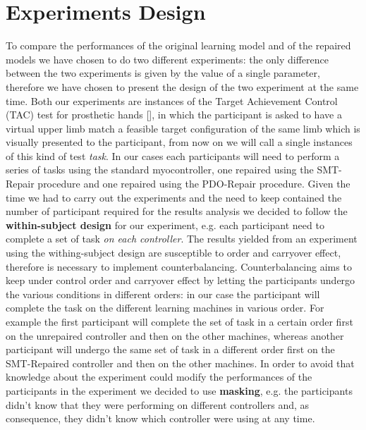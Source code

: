 \section{Experiments Design}\label{sec:exp-design}
To compare the performances of the original learning model and of the repaired models we have chosen to do two different experiments: the only difference between the two experiments is given by the value of a single parameter, therefore we have chosen to present the design of the two experiment at the same time.
Both our experiments are instances of the Target Achievement Control (TAC) test for prosthetic hands [\cite{simon2011target}], in which the participant is asked to have a virtual upper limb match a feasible target configuration of the same limb which is visually presented to the participant, from now on we will call a single instances of this kind of test \textit{task}.
In our cases each participants will need to perform a series of tasks using the standard myocontroller, one repaired using the SMT-Repair procedure and one repaired using the PDO-Repair procedure.
Given the time we had to carry out the experiments and the need to keep contained the number of participant required for the results analysis we decided to follow the \textbf{within-subject design} for our experiment, e.g. each participant need to complete a set of task \textit{on each controller}. The results yielded from an experiment using the withing-subject design are susceptible to order and carryover effect, therefore is necessary to implement counterbalancing. Counterbalancing aims to keep under control order and carryover effect by letting the participants undergo the various conditions in different orders: in our case the participant will complete the task on the different learning machines in various order. For example the first participant will complete the set of task in a certain order first on the unrepaired controller and then on the other machines, whereas another participant will undergo the same set of task in a different order first on the SMT-Repaired controller and then on the other machines.
In order to avoid that knowledge about the experiment could modify the performances of the participants in the experiment we decided to use \textbf{masking}, e.g. the participants didn't know that they were performing on different controllers and, as consequence, they didn't know which controller were using at any time.